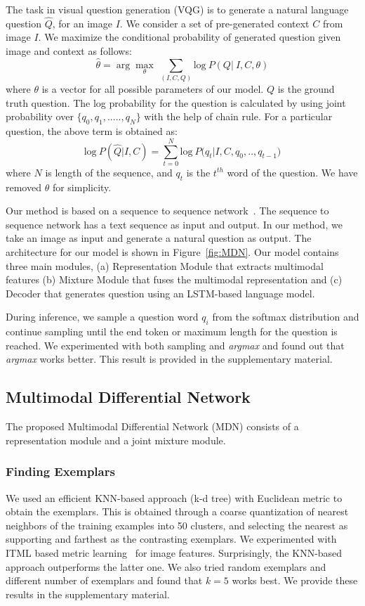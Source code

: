 \documentclass[11pt,a4paper]{article}
\begin{document}
The task in visual question generation (VQG) is to generate a natural language question $\hat{Q}$, for an image $I$. We consider a set of pre-generated context $C$ from image $I$. We maximize the conditional probability of generated question given image and context as follows: \begin{equation}
\label{theta_optim}
 \hat{\theta}=\arg\max_{\theta}\ \sum_{(I,C,Q)}{ \mbox{log}\ P( Q |\ I ,C,\theta )} 
\end{equation}
where $\theta$ is a vector for all possible parameters of our model. $Q$ is the ground truth question. The log probability for the question is calculated by using joint probability over $\{{q_0},{q_1},.....,{q_N}\}$ with the help of chain rule. For a particular question, the above term is obtained as:
\begin{equation*}
 \mbox{log}\ P( \hat{Q} | I , C)=\sum_{t=0}^{N}{ \mbox{log}\ P( {q_t} | I ,C,{q_0},..,{q}_{t-1}} ) 
\end{equation*}
where $N$ is length of the sequence, and $q_t$ is the $t^{th}$ word of the question. We have removed $\theta$ for simplicity. 

Our method is based on a sequence to sequence network~\cite{Sutskever_NIPS2014,Vinyals_CVPR2015,Bahdanau_arXiv2014}. The sequence to sequence network has a text sequence as input and output. In our method, we take an image as input and generate a natural question as output. The architecture for our model is shown in Figure~\ref{fig:MDN}. Our model contains three main modules, (a) Representation Module that extracts multimodal features (b) Mixture Module that fuses the multimodal representation and (c) Decoder that generates question using an LSTM-based language model.

During inference, we sample a question word $q_i$ from the softmax distribution and continue sampling until the end token or maximum length for the question is reached. 
 We experimented with both sampling and \textit{argmax} and found out that \textit{argmax} works better. This result is provided in the supplementary material.
\subsection{Multimodal Differential Network}
The proposed Multimodal Differential Network (MDN) consists of a representation module and a joint mixture module. 


\subsubsection{Finding Exemplars}
We used an efficient KNN-based approach (k-d tree) with Euclidean metric to obtain the exemplars. This is obtained through a coarse quantization of nearest neighbors of the training examples into 50 clusters, and selecting the nearest as supporting and farthest as the contrasting exemplars. 
 We experimented with ITML based metric learning~\cite{davis_ACM2007} for image features. Surprisingly, the KNN-based approach outperforms the latter one. We also tried random exemplars and different number of exemplars and found that $k=5$ works best. We provide these results in the supplementary material.
\end{document}
